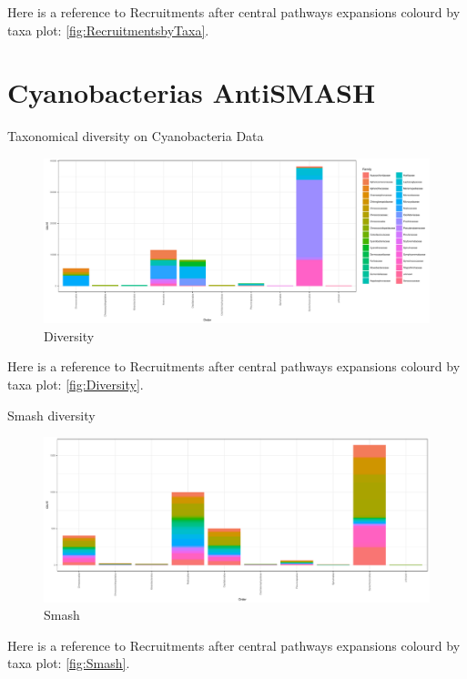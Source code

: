 \documentclass[12pt,twoside]{reedthesis}
\begin{document}
  Here is a reference to Recruitments after central pathways expansions
  colourd by taxa plot: \autoref{fig:RecruitmentsbyTaxa}. \clearpage 
  
  \section{Cyanobacterias AntiSMASH}\label{cyanobacterias-antismash}
  
  Taxonomical diversity on Cyanobacteria Data
  
  \begin{figure}[h!tbp]
  \centering
  \includegraphics[angle = 0,scale = 0.6]{chapter5/Diversity.pdf}
  \caption[Diversity]{\normalsize{Diversity}}
  \label{fig:Diversity}
  \end{figure}
  
  Here is a reference to Recruitments after central pathways expansions
  colourd by taxa plot: \autoref{fig:Diversity}. \clearpage
  
  Smash diversity
  
  \begin{figure}[h!tbp]
  \centering
  \includegraphics[angle = 0,scale = 0.5]{chapter5/Smash.pdf}
  \caption[Smash]{\normalsize{Smash}}
  \label{fig:Smash Taxonomical Diversity}
  \end{figure}
  
  Here is a reference to Recruitments after central pathways expansions
  colourd by taxa plot: \autoref{fig:Smash}. \clearpage
  
\end{document}
